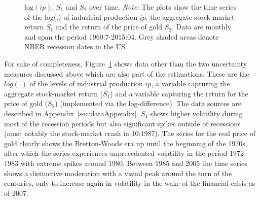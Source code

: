 \documentclass[a4paper,11pt,listof=nochaptergap,oneside,pointednumbers,bibtotoc,bigheadings,liststotoc,hidelinks]{scrbook}
\theoremstyle{mysatz}
\theoremstyle{mydefinition}
\theoremstyle{mytheorem}
\theoremstyle{mybemerkung}
\begin{document}
\begin{figure}[!ht]
   \centering
   \setlength\fboxsep{0pt}
   \setlength\fboxrule{0pt}
      \caption[$\text{log}(ip)$, $S_1$ and $S_2$ over time.]{$\text{log}(ip)$, $S_1$ and $S_2$ over time.
      \textit{Note:} The plots show the time series of the log(.) of industrial production $ip$, the aggregate stock-market return $S_1$ and the return of the price of gold $S_2$. Data are monthly and span the period 1960:7-2015:04. Grey shaded areas denote NBER recession dates in the US.}   \label{fig:plot_other_data}
\end{figure}

For sake of completeness, Figure~\ref{fig:plot_other_data} shows data other than the two uncertainty measures discussed above which are also part of the estimations. These are the $log(.)$ of the levels of industrial production $ip$, a variable capturing the aggregate stock-market return ($S_1$) and a variable capturing the return for the price of gold ($S_2$) (implemented via the log-difference). The data sources are described in Appendix~\ref{sec:dataAppendix}. $S_1$ shows higher volatility during most of the recession periods but also significant spikes outside of recessions (most notably the stock-market crash in 10:1987). The series for the real price of gold clearly shows the Bretton-Woods era up until the beginning of the 1970s, after which the series experiences unprecedented volatility in the period 1972-1983 with extreme spikes around 1980. Between 1985 and 2005 the time series shows a distinctive moderation with a visual peak around the turn of the centuries, only to increase again in volatility in the wake of the financial crisis as of 2007.
\end{document}
